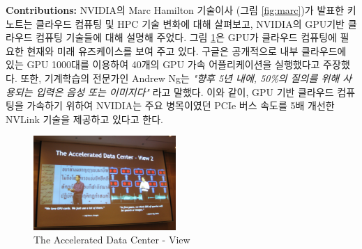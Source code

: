 \documentclass[twocolumn]{article}
\begin{document}
\noindent
\textbf{Contributions:}  NVIDIA의 Marc Hamilton 기술이사 (그림 \ref{fig:marc})가 발표한 키노트는 
클라우드 컴퓨팅 및 HPC 기술 변화에 대해 살펴보고, NVIDIA의 GPU기반 클라우드 컴퓨팅 기술들에 대해 설명해 주었다. 
그림 \ref{fig:accelerated-data-center}은 GPU가 클라우드 컴퓨팅에 필요한 현재와 미래 유즈케이스를 보여 주고 있다.
구글은 공개적으로 내부 클라우드에 있는 GPU 1000대를 이용하여 40개의 GPU 가속 어플리케이션을 실행했다고 주장했다.
또한, 기계학습의 전문가인 Andrew Ng는 \textit{"향후 5년 내에, 50\%의 질의를 위해 사용되는 입력은 음성 또는 이미지다"} 라고 말했다.
이와 같이, GPU 기반 클라우드 컴퓨팅을 가속하기 위하여 NVIDIA는 주요 병목이였던 PCIe 버스 속도를 5배 개선한 NVLink 기술을 제공하고 있다고 한다.

\begin{figure}[htb]
        \centering
        \includegraphics[width=0.48\textwidth]{marc-ppt.png}
        \caption{The Accelerated Data Center - View}
        \label{fig:accelerated-data-center}
\end{figure}
\end{document}
